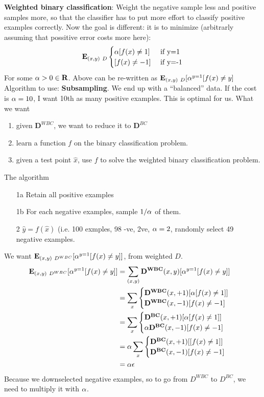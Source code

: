 \textbf{Weighted binary classification}: Weight the negative sample less and
positive samples more, so that the classifier has to put more effort
to classify positive examples correctly. Now the goal is different: it
is to minimize (arbitrarly assuming that possitive error costs more here):
$$\mathbf{E}_{(x,y)~D}
\begin{cases}
  \alpha[f(x)\neq  1]& \text{ if y=1}\\
[f(x)\neq -1] &  \text{ if y=-1}\\
\end{cases}
$$
For some $\alpha > 0 \in \mathbf{R}$. Above can be re-written as
$\mathbf{E}_{(x,y)~D}[\alpha^{y=1}[f(x)\neq y]$
Algorithm to use: \textbf{Subsampling}. We end up with a ``balanced''
data. If the cost is $\alpha=10$, I want 10th as many positive
examples. This is optimal for us.
What we want
\begin{enumerate}
\item given $\mathbf{D}^{WBC}$, we want to reduce it to $\mathbf{D}^{BC}$
\item learn a function $f$ on the binary classification problem.
\item given a test point $\hat x$, use $f$ to solve the weighted
  binary classification problem.
\end{enumerate}
The algorithm
\begin{enumerate}
\item[1a] Retain all positive examples
\item[1b] For each negative examples, sample $1/\alpha$ of them.
\item[2]  $\hat y= f(\hat x)$ (i.e. 100 exmples, 98 -ve, 2ve, $\alpha=2$,
  randomly select 49 negative examples.
\end{enumerate}
We want $\mathbf{E}_{(x,y)~D^{WBC}}[\alpha^{y=1}[f(x)\neq y]]$, from
weighted $D$.
\begin{align*}
  \mathbf{E}_{(x,y)~D^{WBC}}[\alpha^{y=1}[f(x)\neq y]]&=
 \sum_{(x,y)}\mathbf{D^{WBC}}(x,y)[\alpha^{y=1}[f(x)\neq y]]\\
 &= \sum_x \begin{cases} \mathbf{D^{WBC}}(x, +1)[\alpha [f(x)\neq 1]]& \\
     \mathbf{D^{WBC}}(x, -1)[f(x)\neq -1]\end{cases}\\
 &= \sum_x \begin{cases} \mathbf{D^{BC}}(x, +1)[\alpha [f(x)\neq 1]]\\
     \alpha\mathbf{D^{BC}}(x, -1)[f(x)\neq -1]\end{cases}\\
 &= \alpha \sum_x\begin{cases} \mathbf{D^{BC}}(x, +1)[[f(x)\neq 1]]\\
     \mathbf{D^{BC}}(x, -1)[f(x)\neq -1]\end{cases}\\
&=\alpha \epsilon
\end{align*}
Because we downselected negative examples, so to go from $D^{WBC}$ to
$D^{BC}$, we need to multiply it with $\alpha$. 

